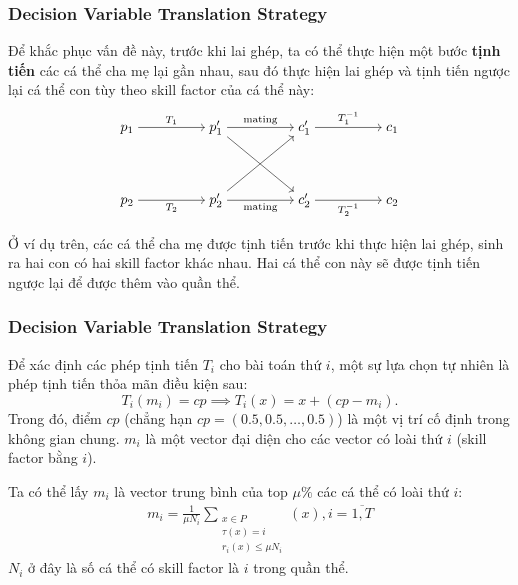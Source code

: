 \begin{frame}[fragile]
\frametitle{Decision Variable Translation Strategy}
  Để khắc phục vấn đề này, trước khi lai ghép, ta có thể thực hiện một bước
  \textbf{tịnh tiến} các cá thể cha mẹ lại gần nhau, sau đó thực hiện lai ghép
  và tịnh tiến ngược lại cá thể con tùy theo skill factor của cá thể này:
\[\begin{tikzcd}[cramped]
	{p_1} && {p_1'} && {c_1'} && {c_1} \\
	\\
	{p_2} && {p_2'} && {c'_2} && {c_2}
	\arrow["{T_1}", from=1-1, to=1-3]
	\arrow["{T_2}"', from=3-1, to=3-3]
	\arrow[from=3-3, to=1-5]
	\arrow[from=1-3, to=3-5]
	\arrow["{\text{mating}}", from=1-3, to=1-5]
	\arrow["{\text{mating}}"', from=3-3, to=3-5]
	\arrow["{T_1^{-1}}", from=1-5, to=1-7]
	\arrow["{T_2^{-1}}"', from=3-5, to=3-7]
\end{tikzcd}\]

Ở ví dụ trên, các cá thể cha mẹ được tịnh tiến trước khi thực hiện lai ghép,
sinh ra hai con có hai skill factor khác nhau. Hai cá thể con này sẽ được tịnh
tiến ngược lại để được thêm vào quần thể.
\end{frame}

\begin{frame}[fragile]
\frametitle{Decision Variable Translation Strategy}
Để xác định các phép tịnh tiến \( T_{i} \) cho bài toán thứ \( i \), một sự lựa
chọn tự nhiên là phép tịnh tiến thỏa mãn điều kiện sau:
\[
  T_{i}(m_{i}) = cp \implies T_{i}(x) = x + (cp - m_{i})
.\]
Trong đó, điểm \( cp \) (chẳng hạn \( cp = (0.5, 0.5, \ldots , 0.5) \)) là một
vị trí cố định trong không gian chung. \( m_{i} \) là một vector đại diện cho
các vector có loài thứ \( i \) (skill factor bằng \( i \)).

Ta có thể lấy \( m_{i} \) là vector trung bình của top \( \mu \% \) các cá thể
có loài thứ \( i \):
\begin{gather*}
  m_{i} =  \frac{1}{\mu N_{i}}\sum_{\substack{x \in P\\\tau (x) = i\\ r_{i}(x)
  \le \mu N_{i}}}(x), i=\overline{1,T}
\end{gather*}
\( N_{i} \) ở đây là số cá thể có skill factor là \( i \) trong quần thể.
\end{frame}


